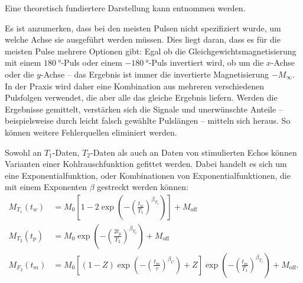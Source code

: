 Eine theoretisch fundiertere Darstellung kann \cite[insb. Kap. 6.2 und 10.2.3]{schmidt-rohr_multidimensional_1994} entnommen werden.

Es ist anzumerken, dass bei den meisten Pulsen nicht spezifiziert wurde, um welche Achse sie ausgeführt werden müssen. Dies liegt daran, dass es für die meisten Pulse mehrere Optionen gibt: Egal ob die Gleichgewichtsmagnetisierung mit einem $\SI{180}{\degree}$-Puls oder einem $\SI{-180}{\degree}$-Puls invertiert wird, ob um die $x$-Achse oder die $y$-Achse -- das Ergebnis ist immer die invertierte Magnetisierung $-M_\infty$. In der Praxis wird daher eine Kombination aus mehreren verschiedenen Pulsfolgen verwendet, die aber alle das gleiche Ergebnis liefern. Werden die Ergebnisse gemittelt, verstärken sich die Signale und unerwünschte Anteile -- beispielsweise durch leicht falsch gewählte Pulslängen -- mitteln sich heraus. So können weitere Fehlerquellen eliminiert werden.


Sowohl an $T_1$-Daten, $T_2$-Daten als auch an Daten von stimulierten Echos können Varianten einer Kohlrauschfunktion gefittet werden. Dabei handelt es sich um eine Exponentialfunktion, oder Kombinationen von Exponentialfunktionen, die mit einem Exponenten $\beta$ gestreckt werden können:
\begin{align}
	M_{T_1} (t_w) & = M_0 \left[ 1 - 2 \exp{ \left(- { \left( \frac{t_w}{T_1} \right) }^{\beta_{T_1}} \right)} \right] + M_\text{off} \label{eqn:theo:T_1_fit}                                                                     \\
	M_{T_2} (t_p) & = M_0 \exp{ \left(- { \left( \frac{2 t_p}{T_2} \right) }^{\beta_{T_2}} \right)} + M_\text{off} \label{eqn:theo:T_2_fit}                                                                                        \\
	M_{F_2} (t_m) & = M_0 \left[  \left(1 - Z\right) \exp\left(- \left(\frac{t_m}{\tau}\right)^{\beta_C}\right) + Z \right] \exp\left(- \left(\frac{t_m}{T_1}\right)^{\beta_{T_1}}\right) + M_\text{off}. \label{eqn:theo:F_2_fit}
\end{align}

